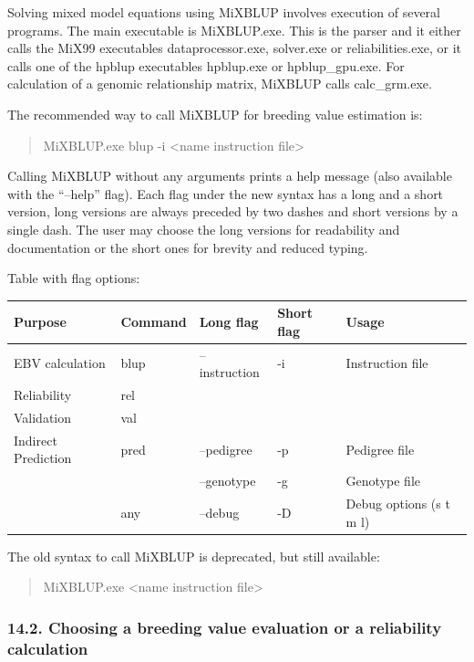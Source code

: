 Solving mixed model equations using MiXBLUP involves execution of
several programs. The main executable is MiXBLUP.exe. This is the parser
and it either calls the MiX99 executables dataprocessor.exe, solver.exe
or reliabilities.exe, or it calls one of the hpblup executables
hpblup.exe or hpblup\_gpu.exe. For calculation of a genomic relationship
matrix, MiXBLUP calls calc\_grm.exe.

The recommended way to call MiXBLUP for breeding value estimation is:

\begin{quote}
MiXBLUP.exe blup -i \textless name instruction file\textgreater{}
\end{quote}

Calling MiXBLUP without any arguments prints a help message (also
available with the ``--help'' flag). Each flag under the new syntax has
a long and a short version, long versions are always preceded by two
dashes and short versions by a single dash. The user may choose the long
versions for readability and documentation or the short ones for brevity
and reduced typing.

Table with flag options:

{\def\LTcaptype{none} %
\begin{longtable}[]{@{}lllll@{}}
\toprule\noalign{}
Purpose & Command & Long flag & Short flag & Usage \\
\midrule\noalign{}
\endhead
\bottomrule\noalign{}
\endlastfoot
EBV calculation & blup & --instruction & -i & Instruction file \\
Reliability & rel & & & \\
Validation & val & & & \\
Indirect Prediction & pred & --pedigree & -p & Pedigree file \\
& & --genotype & -g & Genotype file \\
& any & --debug & -D & Debug options (s t m l) \\
\end{longtable}
}

The old syntax to call MiXBLUP is deprecated, but still available:

\begin{quote}
MiXBLUP.exe \textless name instruction file\textgreater{}
\end{quote}

\subsubsection{14.2. Choosing a breeding value evaluation or a
reliability calculation}\label{Runn03}


